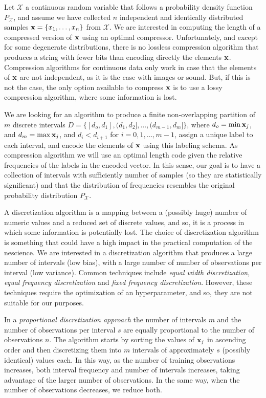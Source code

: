 Let $\mathcal{X}$ a continuous random variable that follows a probability density function $P_\mathcal{X}$, and assume we have collected $n$ independent and identically distributed samples $\bold{x} = \{x_1, \ldots, x_n\}$ from $\mathcal{X}$. We are interested in computing the length of a compressed version of $\bold{x}$ using an optimal compressor. Unfortunately, and except for some degenerate distributions, there is no lossless compression algorithm that produces a string with fewer bits than encoding directly the elements $\bold{x}$. Compression algorithms for continuous data only work in case that the elements of $\bold{x}$ are not independent, as it is the case with images or sound. But, if this is not the case, the only option available to compress $\bold{x}$ is to use a lossy compression algorithm, where some information is lost.

We are looking for an algorithm to produce a finite non-overlapping partition of $m$ discrete intervals $D=\{ [d_o, d_1], (d_1, d_2], \ldots, (d_{m-1}, d_m] \}$, where $d_o = \min{\bold{x}_j}$, and $d_m = \max{\bold{x}_j}$, and $d_i < d_{i+1}$ for $i = 0, 1, \ldots, m-1$, assign a unique label to each interval, and encode the elements of $\bold{x}$ using this labeling schema. As compression algorithm we will use an optimal length code given the relative frequencies of the labels in the encoded vector. In this sense, our goal is to have a collection of intervals with sufficiently number of samples (so they are statistically significant) and that the distribution of frequencies resembles the original probability distribution $P_\mathcal{X}$.

A discretization algorithm is a mapping between a (possibly huge) number of numeric values and a reduced set of discrete values, and so, it is a process in which some information is potentially lost. The choice of discretization algorithm is something that could have a high impact in the practical computation of the nescience. We are interested in a discretization algorithm that produces a large number of intervals (low bias), with a large number of number of observations per interval (low variance). Common techniques include \emph{equal width discretization}, \emph{equal frequency discretization} and \emph{fixed frequency discretization}. However, these techniques require the optimization of an hyperparameter, and so, they are not suitable for our purposes.

In a \emph{proportional discretization approach} the number of intervals $m$ and the number of observations per interval $s$ are equally proportional to the number of observations $n$. The algorithm starts by sorting the values of $\bold{x}_j$ in ascending order and then discretizing them into $m$ intervals of approximately $s$ (possibly identical) values each. In this way, as the number of training observations increases, both interval frequency and number of intervals increases, taking advantage of the larger number of observations. In the same way, when the number of observations decreases, we reduce both.



